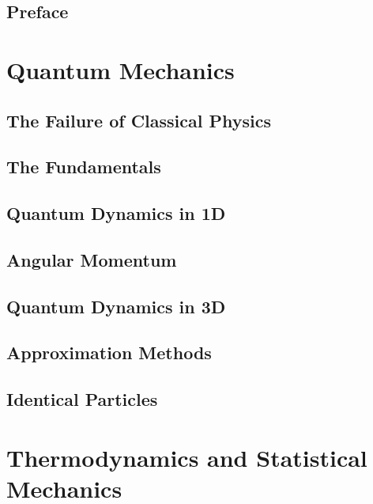 \documentclass[a4paper, 11pt]{book}
\newcommand{\1}{\opr{\mathds{1}}}
\begin{document}


\chapter*{Preface}
	
\tableofcontents
{}
\part{Quantum Mechanics}
	\chapter{The Failure of Classical Physics}
		
	\chapter{The Fundamentals}
		
	\chapter{Quantum Dynamics in 1D}
		
		\chapter{Angular Momentum}
		
	\chapter{Quantum Dynamics in 3D}
		
	\chapter{Approximation Methods}
		
	\chapter{Identical Particles}
		
\part{Thermodynamics and Statistical Mechanics}
		
		
		
		
\end{document}

